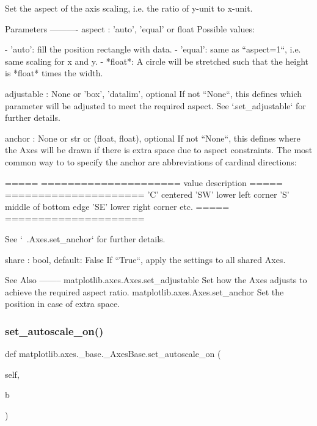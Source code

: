 \begin{DoxyVerb}Set the aspect of the axis scaling, i.e. the ratio of y-unit to x-unit.

Parameters
----------
aspect : {'auto', 'equal'} or float
    Possible values:

    - 'auto': fill the position rectangle with data.
    - 'equal': same as ``aspect=1``, i.e. same scaling for x and y.
    - *float*: A circle will be stretched such that the height
      is *float* times the width.

adjustable : None or {'box', 'datalim'}, optional
    If not ``None``, this defines which parameter will be adjusted to
    meet the required aspect. See `.set_adjustable` for further
    details.

anchor : None or str or (float, float), optional
    If not ``None``, this defines where the Axes will be drawn if there
    is extra space due to aspect constraints. The most common way to
    to specify the anchor are abbreviations of cardinal directions:

    =====   =====================
    value   description
    =====   =====================
    'C'     centered
    'SW'    lower left corner
    'S'     middle of bottom edge
    'SE'    lower right corner
    etc.
    =====   =====================

    See `~.Axes.set_anchor` for further details.

share : bool, default: False
    If ``True``, apply the settings to all shared Axes.

See Also
--------
matplotlib.axes.Axes.set_adjustable
    Set how the Axes adjusts to achieve the required aspect ratio.
matplotlib.axes.Axes.set_anchor
    Set the position in case of extra space.
\end{DoxyVerb}
 \mbox{\label{classmatplotlib_1_1axes_1_1__base_1_1__AxesBase_a53c98fcca20db3bac0310f1f0a3ca6e8}} 
\subsubsection{\texorpdfstring{set\+\_\+autoscale\+\_\+on()}{set\_autoscale\_on()}}
{\footnotesize\ttfamily def matplotlib.\+axes.\+\_\+base.\+\_\+\+Axes\+Base.\+set\+\_\+autoscale\+\_\+on (\begin{DoxyParamCaption}\item[{}]{self,  }\item[{}]{b }\end{DoxyParamCaption})}

